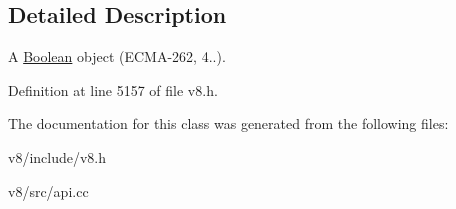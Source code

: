 \subsection{Detailed Description}
A \mbox{\hyperlink{classv8_1_1Boolean}{Boolean}} object (E\+C\+M\+A-\/262, 4..). 

Definition at line 5157 of file v8.\+h.



The documentation for this class was generated from the following files\+:\begin{DoxyCompactItemize}
\item 
v8/include/v8.\+h\item 
v8/src/api.\+cc\end{DoxyCompactItemize}
